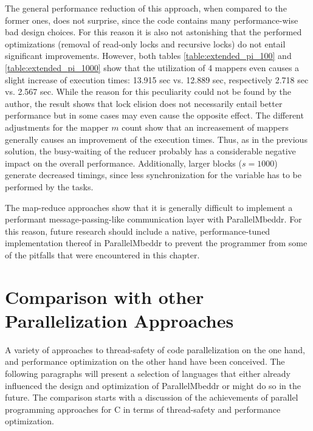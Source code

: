 The general performance reduction of this approach, when compared to the former ones, does not surprise, since the code contains many performance-wise bad design choices. For this reason it is also not astonishing that the performed optimizations (removal of read-only locks and recursive locks) do not entail significant improvements. However, both tables \ref{table:extended_pi_100} and \ref{table:extended_pi_1000} show that the utilization of 4 mappers even causes a slight increase of execution times: 13.915 sec vs. 12.889 sec, respectively 2.718 sec vs. 2.567 sec. While the reason for this peculiarity could not be found by the author, the result shows that lock elision does not necessarily entail better performance but in some cases may even cause the opposite effect. The different adjustments for the mapper $m$ count show that an increasement of mappers generally causes an improvement of the execution times. Thus, as in the previous solution, the busy-waiting of the reducer probably has a considerable negative impact on the overall performance. Additionally, larger blocks ($s = 1000$) generate decreased timings, since less synchronization for the  variable has to be performed by the tasks.

The map-reduce approaches show that it is generally difficult to implement a performant message-passing-like communication layer with ParallelMbeddr. For this reason, future research should include a native, performance-tuned implementation thereof in ParallelMbeddr to prevent the programmer from some of the pitfalls that were encountered in this chapter.

\section{Comparison with other Parallelization Approaches}
A variety of approaches to thread-safety of code parallelization on the one hand, and performance optimization on the other hand have been conceived. The following paragraphs will present a selection of languages that either already influenced the design and optimization of ParallelMbeddr or might do so in the future. The comparison starts with a discussion of the achievements of parallel programming approaches for C in terms of thread-safety and performance optimization. 

